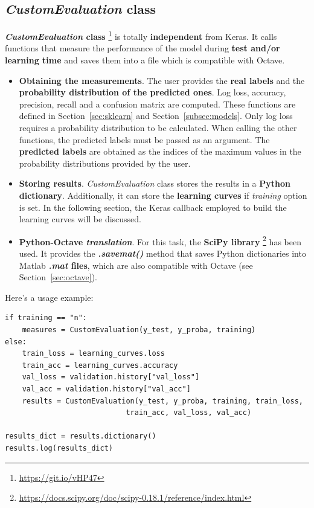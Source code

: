 \subsection{\textit{CustomEvaluation} class}
\textbf{\textit{CustomEvaluation} class} \footnote{\url{https://git.io/vHP47}} is totally \textbf{independent} from Keras. It calls functions that measure the performance of the model during \textbf{test and/or learning time} and saves them into a file which is compatible with Octave.
\begin{itemize}
	\item \textbf{Obtaining the measurements}. The user provides the \textbf{real labels} and the \textbf{probability distribution of the predicted ones}. Log loss, accuracy, precision, recall and a confusion matrix are computed. These functions are defined in Section~\ref{sec:sklearn} and Section~\ref{subsec:models}. Only log loss requires a probability distribution to be calculated. When calling the other functions, the predicted labels must be passed as an argument. The \textbf{predicted labels} are obtained as the indices of the maximum values in the probability distributions provided by the user.
	\item \textbf{Storing results}. \textit{CustomEvaluation} class stores the results in a \textbf{Python dictionary}. Additionally, it can store the \textbf{learning curves} if \textit{training} option is set. In the following section, the Keras callback employed to build the learning curves will be discussed.
	\item \textbf{Python-Octave \textit{translation}}. For this task, the \textbf{SciPy library} \footnote{\url{https://docs.scipy.org/doc/scipy-0.18.1/reference/index.html}} has been used. It provides the \textbf{\textit{.savemat()}} method that saves Python dictionaries into Matlab \textbf{\textit{.mat} files}, which are also compatible with Octave (see Section~\ref{sec:octave}).
\end{itemize}

Here's a usage example:
\begin{lstlisting}
if training == "n":
	measures = CustomEvaluation(y_test, y_proba, training)
else:
	train_loss = learning_curves.loss
	train_acc = learning_curves.accuracy
	val_loss = validation.history["val_loss"]
	val_acc = validation.history["val_acc"]
	results = CustomEvaluation(y_test, y_proba, training, train_loss,
	                        train_acc, val_loss, val_acc)

results_dict = results.dictionary()
results.log(results_dict)
\end{lstlisting}

